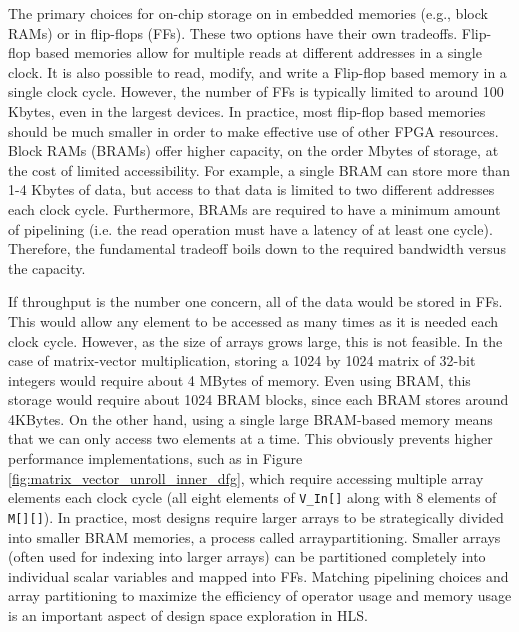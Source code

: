 The primary choices for on-chip storage on in embedded memories (e.g., block RAMs) or in flip-flops (FFs). These two options have their own tradeoffs. Flip-flop based memories allow for multiple reads at different addresses in a single clock.  It is also possible to read, modify, and write a Flip-flop based memory in a single clock cycle.  However, the number of FFs is typically limited to around 100 Kbytes, even in the largest devices. In practice, most flip-flop based memories should be much smaller in order to make effective use of other FPGA resources.  Block RAMs (BRAMs) offer higher capacity, on the order Mbytes of storage, at the cost of limited accessibility. For example, a single BRAM can store more than 1-4 Kbytes of data, but access to that data is limited to two different addresses each clock cycle. Furthermore, BRAMs are required to have a minimum amount of pipelining (i.e. the read operation must have a latency of at least one cycle).  Therefore, the fundamental tradeoff boils down to the required bandwidth versus the capacity. 

If throughput is the number one concern, all of the data would be stored in FFs. This would allow any element to be accessed as many times as it is needed each clock cycle. However, as the size of arrays grows large, this is not feasible.  In the case of matrix-vector multiplication, storing a 1024 by 1024 matrix of 32-bit integers would require about 4 MBytes of memory.   Even using BRAM, this storage would require about 1024 BRAM blocks, since each BRAM stores around 4KBytes.  On the other hand, using a single large BRAM-based memory means that we can only access two elements at a time.  This obviously prevents higher performance implementations, such as in Figure \ref{fig:matrix_vector_unroll_inner_dfg}, which require accessing multiple array elements each clock cycle (all eight elements of \lstinline|V_In[]| along with 8 elements of \lstinline|M[][]|).  In practice, most designs require larger arrays to be strategically divided into smaller BRAM memories, a process called \gls{arraypartitioning}.  Smaller arrays (often used for indexing into larger arrays) can be partitioned completely into individual scalar variables and mapped into FFs.  Matching pipelining choices and array partitioning to maximize the efficiency of operator usage and memory usage is an important aspect of design space exploration in HLS.

